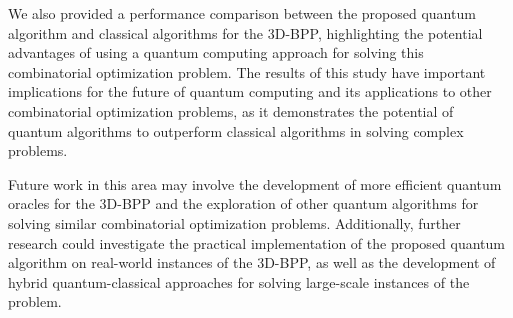 We also provided a performance comparison between the proposed quantum algorithm and classical algorithms for the 3D-BPP, highlighting the potential advantages of using a quantum computing approach for solving this combinatorial optimization problem. The results of this study have important implications for the future of quantum computing and its applications to other combinatorial optimization problems, as it demonstrates the potential of quantum algorithms to outperform classical algorithms in solving complex problems.

Future work in this area may involve the development of more efficient quantum oracles for the 3D-BPP and the exploration of other quantum algorithms for solving similar combinatorial optimization problems. Additionally, further research could investigate the practical implementation of the proposed quantum algorithm on real-world instances of the 3D-BPP, as well as the development of hybrid quantum-classical approaches for solving large-scale instances of the problem.

